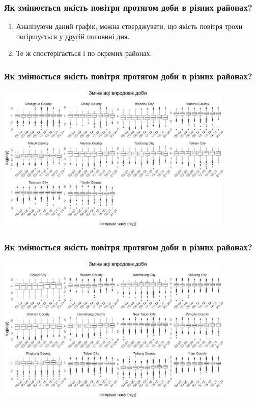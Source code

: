\documentclass{beamer}
\begin{document}
\begin{frame}
  \frametitle{Як змінюється якість повітря протягом доби в різних районах?}

  \begin{enumerate}
    \item Аналізуючи даний графік, можна стверджувати, що якість повітря трохи
    погіршується у другій половині дня.
    \item Те ж спостерігається і по окремих районах.
  \end{enumerate}
\end{frame}

\begin{frame}
  \frametitle{Як змінюється якість повітря протягом доби в різних районах?}

  \begin{center}
    \includegraphics[height=2.8in]{plots/question3/county-box-p1.png}
  \end{center}
\end{frame}

\begin{frame}
  \frametitle{Як змінюється якість повітря протягом доби в різних районах?}

  \begin{center}
    \includegraphics[height=2.8in]{plots/question3/county-box-p2.png}
  \end{center}
\end{frame}
\end{document}
